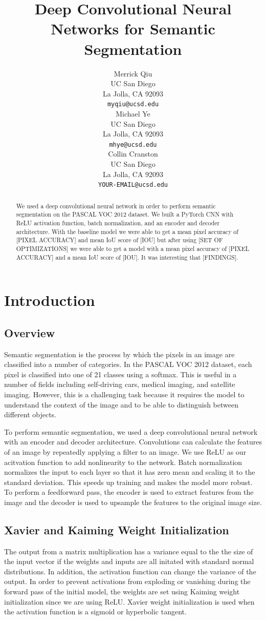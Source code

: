 \documentclass{article}
\title{Deep Convolutional Neural Networks for Semantic Segmentation}
\author{
  Merrick Qiu\\
  UC San Diego\\
  La Jolla, CA 92093 \\
  \texttt{myqiu@ucsd.edu} \\
  \And
  Michael Ye \\
  UC San Diego \\
  La Jolla, CA 92093 \\
  \texttt{mhye@ucsd.edu} \\
  \AND
  Collin Cranston \\
  UC San Diego \\
  La Jolla, CA 92093 \\
  \texttt{YOUR-EMAIL@ucsd.edu} \\
}
\begin{document}
\maketitle


\begin{abstract}
  We used a deep convolutional neural network in order to perform semantic segmentation on
  the PASCAL VOC 2012 dataset. 
  We built a PyTorch CNN with ReLU activation function, batch normalization, and an encoder and decoder architecture.
  With the baseline model we were able to get a mean pixel accuracy of [PIXEL ACCURACY] and mean IoU score of [IOU] but after using [SET OF OPTIMIZATIONS] 
  we were able to get a model with a mean pixel accuracy of [PIXEL ACCURACY] and a mean IoU score of [IOU].
  It was interesting that [FINDINGS].
\end{abstract}


\section{Introduction}
\subsection{Overview}
Semantic segmentation is the process by which the pixels in an image are classified into a number of categories.
In the PASCAL VOC 2012 dataset, each pixel is classified into one of 21 classes using a softmax.
This is useful in a number of fields including self-driving cars, medical imaging, and satellite imaging.
However, this is a challenging task because it requires the model to understand the context of the image and to be able to
distinguish between different objects. 

To perform semantic segmentation, we used a deep convolutional neural network with an encoder and decoder architecture.
Convolutions can calculate the features of an image by repeatedly applying a filter to an image.
We use ReLU as our acitvation function to add nonlinearity to the network. 
Batch normalization normalizes the input to each layer so that it has zero mean and scaling it to the standard deviation.
This speeds up training and makes the model more robust.
To perform a feedforward pass,
the encoder is used to extract features from the image and the decoder is used to upsample the features to the original image size.


\subsection{Xavier and Kaiming Weight Initialization}
The output from a matrix multiplication has a variance equal to the 
the size of the input vector if the weights and inputs 
are all initated with standard normal distributions.
In addition, the activation function can change the variance of the output.
In order to prevent activations from exploding or vanishing during the forward pass of the initial model,
the weights are set using Kaiming weight initialization since we are using ReLU.
Xavier weight initialization is used when the activation function is a sigmoid or hyperbolic tangent.
\end{document}

